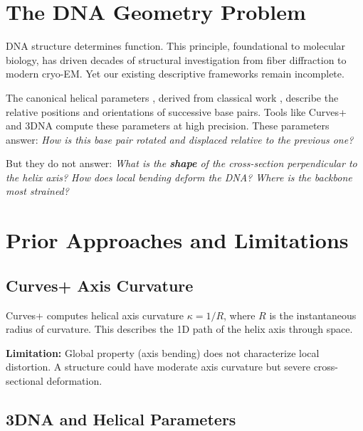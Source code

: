 

\section{The DNA Geometry Problem}

DNA structure determines function. This principle, foundational to molecular biology, has driven decades of structural investigation from fiber diffraction to modern cryo-EM. Yet our existing descriptive frameworks remain incomplete.


The canonical helical parameters \citep{Dickerson1989}, derived from classical work \citep{Watson1953}, describe the relative positions and orientations of successive base pairs. Tools like Curves+ \citep{Lavery1989} and 3DNA \citep{Lu2003} compute these parameters at high precision. These parameters answer: \textit{How is this base pair rotated and displaced relative to the previous one?}

But they do not answer: \textit{What is the \textbf{shape} of the cross-section perpendicular to the helix axis? How does local bending deform the DNA? Where is the backbone most strained?}

\section{Prior Approaches and Limitations}

\subsection{Curves+ Axis Curvature}

Curves+ \citep{Lavery1989} computes helical axis curvature $\kappa = 1/R$, where $R$ is the instantaneous radius of curvature. This describes the 1D path of the helix axis through space.

\textbf{Limitation:} Global property (axis bending) does not characterize local distortion. A structure could have moderate axis curvature but severe cross-sectional deformation.

\subsection{3DNA and Helical Parameters}

